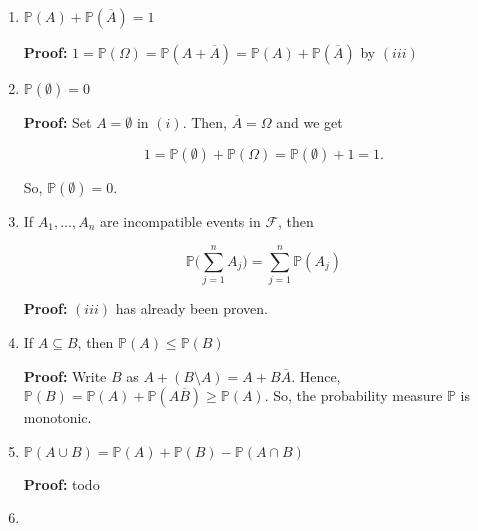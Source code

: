 \documentclass[12pt]{article}
\newcommand{\field}{\mathcal{F}}
\newcommand{\prob}[1]{\mathbb{P}(#1)}
\begin{document}
\begin{enumerate}[label=(\roman*)]
\item $\prob{A} + \prob{\overline{A}} = 1$

\begin{adjustwidth}{2.5em}{0pt}
\textbf{Proof:} $1=\prob{\Omega}=\prob{A + \overline{A}} = \prob{A} + \prob{\overline{A}}$ by $(iii)$
\end{adjustwidth}

\item $\prob{\emptyset}=0$

\begin{adjustwidth}{2.5em}{0pt}
\textbf{Proof:} Set $A = \emptyset$ in $(i)$. Then, $\overline{A} = \Omega$ and we get

\begin{equation*}
1 = \prob{\emptyset} + \prob{\Omega} = \prob{\emptyset} + 1 = 1.
\end{equation*}

\noindent
So, $\prob{\emptyset} =  0$.
\end{adjustwidth}

\item If $A_1, \ldots, A_n$ are incompatible events in $\field$, then

\begin{equation*}
\mathbb{P} \Big ( \sum_{j=1}^{n} A_j \Big ) = \sum_{j=1}^{n} \prob{A_j}
\end{equation*}

\begin{adjustwidth}{2.5em}{0pt}
\textbf{Proof:} $(iii)$ has already been proven.
\end{adjustwidth}

\item If $A \subseteq B$, then $\prob{A} \leq \prob{B}$

\begin{adjustwidth}{2.5em}{0pt}
\textbf{Proof:} Write $B$ as $A + (B \setminus A) = A + B\overline{A}$. Hence, $\prob{B} = \prob{A} + \prob{A\overline{B}} \geq \prob{A}$. So, the probability measure $\mathbb{P}$ is monotonic.
\end{adjustwidth}

\item $\prob{A \cup  B} = \prob{A} + \prob{B} - \prob{A \cap B}$

\begin{adjustwidth}{2.5em}{0pt}
\textbf{Proof:} todo
\end{adjustwidth}

\item 


\end{enumerate}
\end{document}
